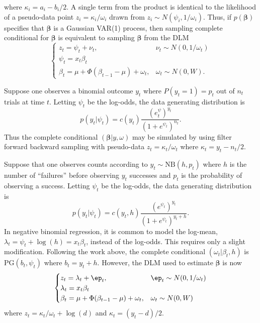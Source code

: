 \documentclass[11pt]{article}
\newcommand{\PG}{\text{PG}}
\newcommand{\NB}{\text{NB}}
\newcommand{\bbeta}{\boldsymbol{\beta}}
\begin{document}
where $\kappa_i = a_i - b_i / 2$.  A single term from the product is identical
to the likelihood of a pseudo-data point $z_i = \kappa_i / \omega_i$ drawn from
$z_i \sim N(\psi_i, 1/\omega_i)$.  Thus, if $p(\bbeta)$ specifies that $\bbeta$
is a Gaussian VAR(1) process, then sampling complete conditional for $\bbeta$ is
equivalent to sampling $\bbeta$ from the DLM
\[
\begin{cases}
z_t = \psi_t + \nu_t, & \nu_t \sim N(0, 1/\omega_t) \\
\psi_t = x_t \beta_t \\
\beta_t = \mu + \Phi (\beta_{t-1} - \mu) + \omega_t, & \omega_t \sim N(0, W).
\end{cases}
\]

\begin{example}
Suppose one observes a binomial outcome $y_t$ where $P(y_t = 1) = p_t$ out of
$n_t$ trials at time $t$.  Letting $\psi_t$ be the log-odds, the data generating
distribution is
\[
p(y_t | \psi_t) = c(y_t) \frac{(e^\psi_t)^{y_t}}{(1+e^{\psi_t})^{n_t}}.
\]
Thus the complete conditional $(\bbeta | y, \omega)$ may be simulated by using
filter forward backward sampling with pseudo-data $z_t = \kappa_t / \omega_t$
where $\kappa_t = y_t - n_t / 2$.
\end{example}


\begin{example}
Suppose that one observes counts according to $y_t \sim \NB(h, p_t)$ where $h$
is the number of ``failures'' before observing $y_t$ successes and $p_t$ is the
probability of observing a success.  Letting $\psi_t$ be the log-odds, the data
generating distribution is
\[
p(y_t | \psi_t) = c(y_t, h) \frac{(e^{\psi_t})^{y_t}}{(1+e^{\psi_t})^{y_t+h}}.
\]
In negative binomial regression, it is common to model the log-mean, $\lambda_t
= \psi_t + \log(h) = x_t \beta_t$, instead of the log-odds.  This requires only
a slight modification.  Following the work above, the complete conditional
$(\omega_t | \beta_t, h)$ is $\PG(b_t, \psi_t)$ where $b_t = y_t + h$.  However,
the DLM used to estimate $\bbeta$ is now
\[
\begin{cases}
z_t = \lambda_t + \ep_t, & \ep_t \sim N(0, 1/\omega_t) \\
\lambda_t = x_t \beta_t \\
\beta_t = \mu + \Phi (\beta_{t-1} - \mu) + \omega_t, & \omega_t \sim N(0, W)
\end{cases}
\]
where $z_t = \kappa_t / \omega_t + \log(d)$ and $\kappa_t = (y_t - d) / 2$.
\end{example}
\end{document}
